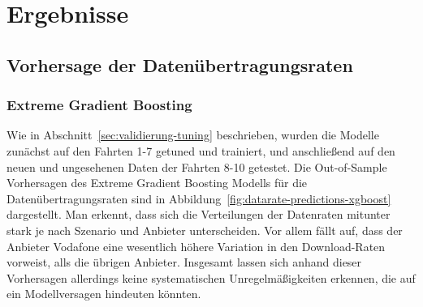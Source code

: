 \section{Ergebnisse}

\subsection{Vorhersage der Daten\"ubertragungsraten}

\subsubsection{Extreme Gradient Boosting}

Wie in Abschnitt~\ref{sec:validierung-tuning} beschrieben, wurden die Modelle zun\"achst auf den Fahrten \mbox{1-7} getuned
und trainiert, und anschlie{\ss}end auf den neuen und ungesehenen Daten der Fahrten 8-10 getestet.
Die Out-of-Sample Vorhersagen des Extreme Gradient Boosting Modells f\"ur die Daten\"ubertragungsraten sind
in Abbildung~\ref{fig:datarate-predictions-xgboost} dargestellt.
Man erkennt, dass sich die Verteilungen der Datenraten mitunter stark je nach Szenario und Anbieter unterscheiden.
Vor allem f\"allt auf, dass der Anbieter Vodafone eine wesentlich h\"ohere Variation in den Download-Raten vorweist,
alls die \"ubrigen Anbieter.
Insgesamt lassen sich anhand dieser Vorhersagen allerdings keine systematischen Unregelm\"a{\ss}igkeiten erkennen,
die auf ein Modellversagen hindeuten k\"onnten.
